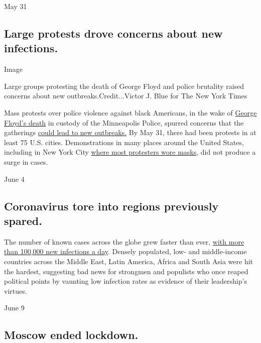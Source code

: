 May 31

\hypertarget{large-protests-drove-concerns-about-new-infections}{%
\subsection{Large protests drove concerns about new
infections.}\label{large-protests-drove-concerns-about-new-infections}}

Image

Large groups protesting the death of George Floyd and police brutality
raised concerns about new outbreaks.Credit...Victor J. Blue for The New
York Times

Mass protests over police violence against black Americans, in the wake
of
\href{https://www.nytimes3xbfgragh.onion/2020/05/27/us/george-floyd-minneapolis-death.html}{George
Floyd's death} in custody of the Minneapolis Police, spurred concerns
that the gatherings
\href{https://www.nytimes3xbfgragh.onion/2020/05/31/health/protests-coronavirus.html?action=click\&module=RelatedLinks\&pgtype=Article}{could
lead to new outbreaks.} By May 31, there had been protests in at least
75 U.S. cities. Demonstrations in many places around the United States,
including in New York City
\href{https://www.nytimes3xbfgragh.onion/2020/07/01/nyregion/nyc-coronavirus-protests.html}{where
most protesters wore masks}, did not produce a surge in cases.

June 4

\hypertarget{coronavirus-tore-into-regions-previously-spared}{%
\subsection{Coronavirus tore into regions previously
spared.}\label{coronavirus-tore-into-regions-previously-spared}}

The number of known cases across the globe grew faster than ever,
\href{https://www.nytimes3xbfgragh.onion/2020/06/04/world/middleeast/coronavirus-egypt-america-africa-asia.html?action=click\&module=RelatedLinks\&pgtype=Article}{with
more than 100,000 new infections a day}. Densely populated, low- and
middle-income countries across the Middle East, Latin America, Africa
and South Asia were hit the hardest, suggesting bad news for strongmen
and populists who once reaped political points by vaunting low infection
rates as evidence of their leadership's virtues.

June 9

\hypertarget{moscow-ended-lockdown}{%
\subsection{Moscow ended lockdown.}\label{moscow-ended-lockdown}}

